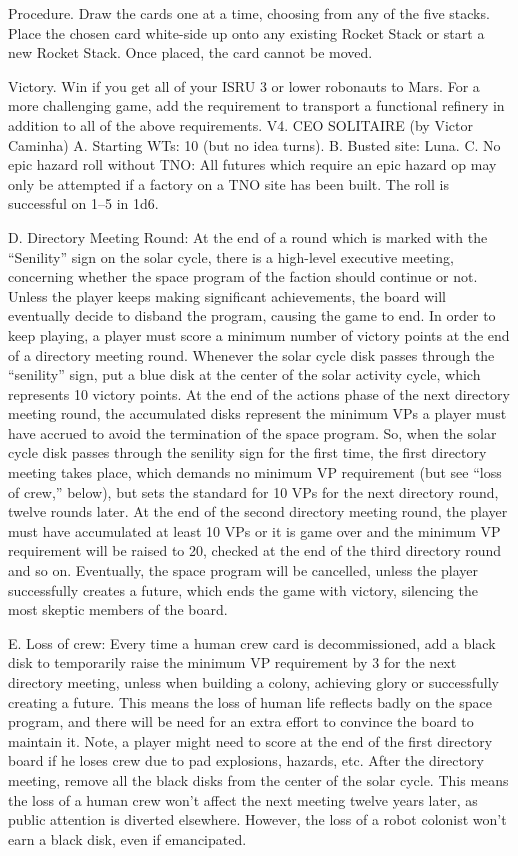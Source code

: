\documentclass[a4paper]{book}
\begin{document}
Procedure. Draw the cards one at a time, choosing from any of the five stacks. Place the chosen card white-side up onto any existing Rocket Stack or start a new Rocket Stack. Once placed, the card cannot be moved.

Victory. Win if you get all of your ISRU 3 or lower robonauts to Mars. For a more challenging game, add the requirement to transport a functional refinery in addition to all of the above requirements.
V4. CEO SOLITAIRE (by Victor Caminha)
A. Starting WTs: 10 (but no idea turns).
B. Busted site: Luna.
C. No epic hazard roll without TNO: All futures which require an epic hazard op may only be attempted if a factory on a TNO site has been built. The roll is successful on 1–5 in 1d6.
 
D. Directory Meeting Round: At the end of a round which is marked with the “Senility” sign on the solar cycle, there is a high-level executive meeting, concerning whether the space program of the faction should continue or not. Unless the player keeps making significant achievements, the board will eventually decide to disband the program, causing the game to end.
In order to keep playing, a player must score a minimum number of victory points at the end of a directory meeting round. Whenever the solar cycle disk passes through the “senility” sign, put a blue disk at the center of the solar activity cycle, which represents 10 victory points. At the end of the actions phase of the next directory meeting round, the accumulated disks represent the minimum VPs a player must have accrued to avoid the termination of the space program.
So, when the solar cycle disk passes through the senility sign for the first time, the first directory meeting takes place, which demands no minimum VP requirement (but see “loss of crew,” below), but sets the standard for 10 VPs for the next directory round, twelve rounds later. At the end of the second directory meeting round, the player must have accumulated at least 10 VPs or it is game over and the minimum VP requirement will be raised to 20, checked at the end of the third directory round and so on. Eventually, the space program will be cancelled, unless the player successfully creates a future, which ends the game with victory, silencing the most skeptic members of the board.
 
E. Loss of crew: Every time a human crew card is decommissioned, add a black disk to temporarily raise the minimum VP requirement by 3 for the next directory meeting, unless when building a colony, achieving glory or successfully creating a future. This means the loss of human life reflects badly on the space program, and there will be need for an extra effort to convince the board to maintain it. Note, a player might need to score at the end of the first directory board if he loses crew due to pad explosions, hazards, etc. After the directory meeting, remove all the black disks from the center of the solar cycle. This means the loss of a human crew won’t affect the next meeting twelve years later, as public attention is diverted elsewhere. However, the loss of a robot colonist won’t earn a black disk, even if emancipated.
 
\end{document}
